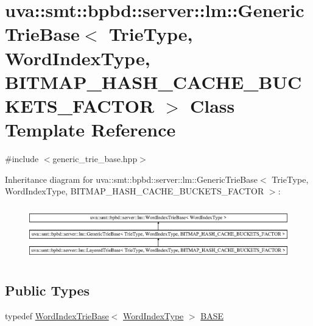 \hypertarget{classuva_1_1smt_1_1bpbd_1_1server_1_1lm_1_1_generic_trie_base}{}\section{uva\+:\+:smt\+:\+:bpbd\+:\+:server\+:\+:lm\+:\+:Generic\+Trie\+Base$<$ Trie\+Type, Word\+Index\+Type, B\+I\+T\+M\+A\+P\+\_\+\+H\+A\+S\+H\+\_\+\+C\+A\+C\+H\+E\+\_\+\+B\+U\+C\+K\+E\+T\+S\+\_\+\+F\+A\+C\+T\+O\+R $>$ Class Template Reference}
\label{classuva_1_1smt_1_1bpbd_1_1server_1_1lm_1_1_generic_trie_base}


{\ttfamily \#include $<$generic\+\_\+trie\+\_\+base.\+hpp$>$}

Inheritance diagram for uva\+:\+:smt\+:\+:bpbd\+:\+:server\+:\+:lm\+:\+:Generic\+Trie\+Base$<$ Trie\+Type, Word\+Index\+Type, B\+I\+T\+M\+A\+P\+\_\+\+H\+A\+S\+H\+\_\+\+C\+A\+C\+H\+E\+\_\+\+B\+U\+C\+K\+E\+T\+S\+\_\+\+F\+A\+C\+T\+O\+R $>$\+:\begin{figure}[H]
\begin{center}
\leavevmode
\includegraphics[height=2.389758cm]{classuva_1_1smt_1_1bpbd_1_1server_1_1lm_1_1_generic_trie_base}
\end{center}
\end{figure}
\subsection*{Public Types}
\begin{DoxyCompactItemize}
\item 
typedef \hyperlink{classuva_1_1smt_1_1bpbd_1_1server_1_1lm_1_1_word_index_trie_base}{Word\+Index\+Trie\+Base}$<$ \hyperlink{classuva_1_1smt_1_1bpbd_1_1server_1_1lm_1_1_word_index_trie_base_a77ee32bf3a9f8a89558bda4f2031200c}{Word\+Index\+Type} $>$ \hyperlink{classuva_1_1smt_1_1bpbd_1_1server_1_1lm_1_1_generic_trie_base_a134996f2451e9c4f0891991da4eb749d}{B\+A\+S\+E}
\end{DoxyCompactItemize}
